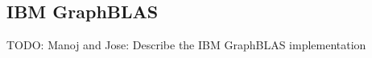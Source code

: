 \subsection{IBM GraphBLAS}


TODO: Manoj and Jose: Describe the IBM GraphBLAS implementation \cite{GPI}

